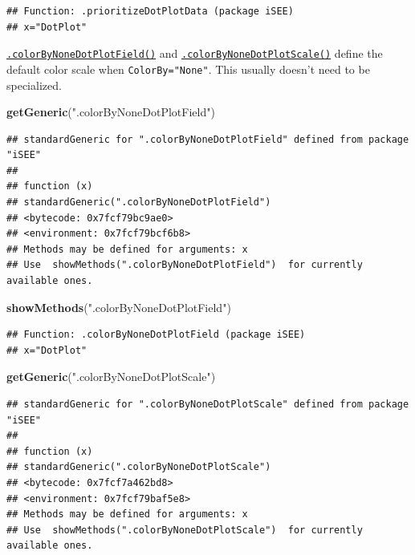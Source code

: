 \documentclass[
]{book}
\newenvironment{Shaded}{\begin{snugshade}}{\end{snugshade}}
\newcommand{\KeywordTok}[1]{\textcolor[rgb]{0.13,0.29,0.53}{\textbf{#1}}}
\newcommand{\NormalTok}[1]{#1}
\newcommand{\StringTok}[1]{\textcolor[rgb]{0.31,0.60,0.02}{#1}}
\begin{document}
\begin{verbatim}
## Function: .prioritizeDotPlotData (package iSEE)
## x="DotPlot"
\end{verbatim}

\href{https://isee.github.io/iSEE/reference/plot-generics.html}{\texttt{.colorByNoneDotPlotField()}} and \href{https://isee.github.io/iSEE/reference/plot-generics.html}{\texttt{.colorByNoneDotPlotScale()}} define the default color scale when \texttt{ColorBy="None"}.
This usually doesn't need to be specialized.

\begin{Shaded}
\begin{Highlighting}[]
\KeywordTok{getGeneric}\NormalTok{(}\StringTok{".colorByNoneDotPlotField"}\NormalTok{)}
\end{Highlighting}
\end{Shaded}

\begin{verbatim}
## standardGeneric for ".colorByNoneDotPlotField" defined from package "iSEE"
## 
## function (x) 
## standardGeneric(".colorByNoneDotPlotField")
## <bytecode: 0x7fcf79bc9ae0>
## <environment: 0x7fcf79bcf6b8>
## Methods may be defined for arguments: x
## Use  showMethods(".colorByNoneDotPlotField")  for currently available ones.
\end{verbatim}

\begin{Shaded}
\begin{Highlighting}[]
\KeywordTok{showMethods}\NormalTok{(}\StringTok{".colorByNoneDotPlotField"}\NormalTok{)}
\end{Highlighting}
\end{Shaded}

\begin{verbatim}
## Function: .colorByNoneDotPlotField (package iSEE)
## x="DotPlot"
\end{verbatim}

\begin{Shaded}
\begin{Highlighting}[]
\KeywordTok{getGeneric}\NormalTok{(}\StringTok{".colorByNoneDotPlotScale"}\NormalTok{)}
\end{Highlighting}
\end{Shaded}

\begin{verbatim}
## standardGeneric for ".colorByNoneDotPlotScale" defined from package "iSEE"
## 
## function (x) 
## standardGeneric(".colorByNoneDotPlotScale")
## <bytecode: 0x7fcf7a462bd8>
## <environment: 0x7fcf79baf5e8>
## Methods may be defined for arguments: x
## Use  showMethods(".colorByNoneDotPlotScale")  for currently available ones.
\end{verbatim}
\end{document}
